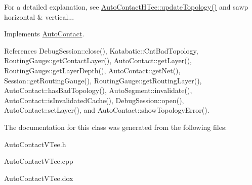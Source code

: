 For a detailed explanation, see \hyperlink{classKatabatic_1_1AutoContactHTee_af5bf1f5e71204ef84346e4e036175431}{Auto\-Contact\-H\-Tee\-::update\-Topology()} and sawp horizontal \& vertical... 

Implements \hyperlink{classKatabatic_1_1AutoContact_a690764ddc997fe9766a79c4b8e0c3e2f}{Auto\-Contact}.



References Debug\-Session\-::close(), Katabatic\-::\-Cnt\-Bad\-Topology, Routing\-Gauge\-::get\-Contact\-Layer(), Auto\-Contact\-::get\-Layer(), Routing\-Gauge\-::get\-Layer\-Depth(), Auto\-Contact\-::get\-Net(), Session\-::get\-Routing\-Gauge(), Routing\-Gauge\-::get\-Routing\-Layer(), Auto\-Contact\-::has\-Bad\-Topology(), Auto\-Segment\-::invalidate(), Auto\-Contact\-::is\-Invalidated\-Cache(), Debug\-Session\-::open(), Auto\-Contact\-::set\-Layer(), and Auto\-Contact\-::show\-Topology\-Error().



The documentation for this class was generated from the following files\-:\begin{DoxyCompactItemize}
\item 
Auto\-Contact\-V\-Tee.\-h\item 
Auto\-Contact\-V\-Tee.\-cpp\item 
Auto\-Contact\-V\-Tee.\-dox\end{DoxyCompactItemize}
